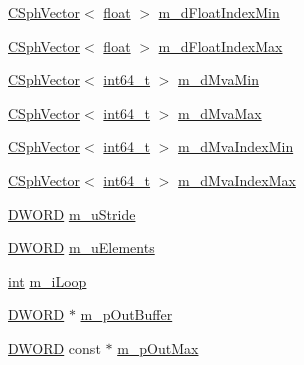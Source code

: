 \begin{DoxyCompactItemize}
\hyperlink{classCSphVector}{C\-Sph\-Vector}$<$ \hyperlink{sphinxexpr_8cpp_a0e0d0739f7035f18f949c2db2c6759ec}{float} $>$ \hyperlink{classAttrIndexBuilder__t_a863127f1f79a220a50f7b7592e356776}{m\-\_\-d\-Float\-Index\-Min}
\item 
\hyperlink{classCSphVector}{C\-Sph\-Vector}$<$ \hyperlink{sphinxexpr_8cpp_a0e0d0739f7035f18f949c2db2c6759ec}{float} $>$ \hyperlink{classAttrIndexBuilder__t_af8a895727cac205bac709a9dc90ed8fe}{m\-\_\-d\-Float\-Index\-Max}
\item 
\hyperlink{classCSphVector}{C\-Sph\-Vector}$<$ \hyperlink{sphinxstd_8h_a996e72f71b11a5bb8b3b7b6936b1516d}{int64\-\_\-t} $>$ \hyperlink{classAttrIndexBuilder__t_a7710364ecf78939b3fcac7888066a854}{m\-\_\-d\-Mva\-Min}
\item 
\hyperlink{classCSphVector}{C\-Sph\-Vector}$<$ \hyperlink{sphinxstd_8h_a996e72f71b11a5bb8b3b7b6936b1516d}{int64\-\_\-t} $>$ \hyperlink{classAttrIndexBuilder__t_a8113ec4e80166abca4b595374f848816}{m\-\_\-d\-Mva\-Max}
\item 
\hyperlink{classCSphVector}{C\-Sph\-Vector}$<$ \hyperlink{sphinxstd_8h_a996e72f71b11a5bb8b3b7b6936b1516d}{int64\-\_\-t} $>$ \hyperlink{classAttrIndexBuilder__t_a595ecd7b9b0bca9541029e6169d4e7cd}{m\-\_\-d\-Mva\-Index\-Min}
\item 
\hyperlink{classCSphVector}{C\-Sph\-Vector}$<$ \hyperlink{sphinxstd_8h_a996e72f71b11a5bb8b3b7b6936b1516d}{int64\-\_\-t} $>$ \hyperlink{classAttrIndexBuilder__t_a4343408a218405a1c9e07f707a928090}{m\-\_\-d\-Mva\-Index\-Max}
\item 
\hyperlink{sphinxstd_8h_a798af1e30bc65f319c1a246cecf59e39}{D\-W\-O\-R\-D} \hyperlink{classAttrIndexBuilder__t_a8018fbae14ab733b2ad584a09ab5881c}{m\-\_\-u\-Stride}
\item 
\hyperlink{sphinxstd_8h_a798af1e30bc65f319c1a246cecf59e39}{D\-W\-O\-R\-D} \hyperlink{classAttrIndexBuilder__t_aa00b7e274246ea48a0c8238888206754}{m\-\_\-u\-Elements}
\item 
\hyperlink{sphinxexpr_8cpp_a4a26e8f9cb8b736e0c4cbf4d16de985e}{int} \hyperlink{classAttrIndexBuilder__t_aeab17a1a912318a2223d618b6897b09f}{m\-\_\-i\-Loop}
\item 
\hyperlink{sphinxstd_8h_a798af1e30bc65f319c1a246cecf59e39}{D\-W\-O\-R\-D} $\ast$ \hyperlink{classAttrIndexBuilder__t_ab3d8486dbc0c32dd6a4f7791658d96b2}{m\-\_\-p\-Out\-Buffer}
\item 
\hyperlink{sphinxstd_8h_a798af1e30bc65f319c1a246cecf59e39}{D\-W\-O\-R\-D} const $\ast$ \hyperlink{classAttrIndexBuilder__t_a41bf49c1c105aac8f17b8d84c8247c20}{m\-\_\-p\-Out\-Max}

\end{DoxyCompactItemize}
